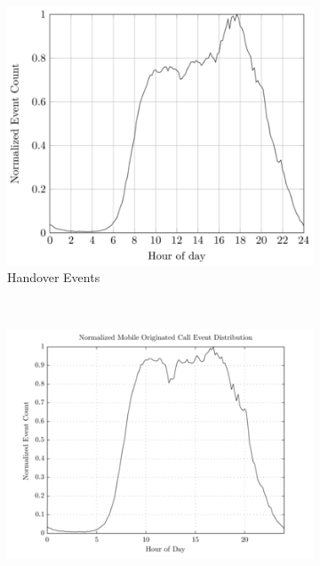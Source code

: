 \documentclass[master,english]{hgbthesis}
\begin{document}
\begin{figure}

	\centering

	\begin{subfigure}[b]{0.5\textwidth}

		\includegraphics[width=\textwidth]{hauf_event_32_time_mat.png}

		\caption{Handover Events}

		\label{fig:disthandover}

	\end{subfigure}%

	~ %


	\begin{subfigure}[b]{0.5\textwidth}

		\includegraphics[width=\textwidth]{hauf_event_34_time_mat.png}


\end{subfigure}
\end{figure}
\end{document}
